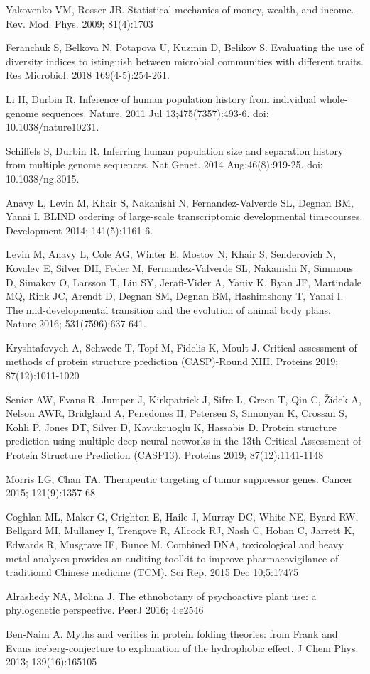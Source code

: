 \documentclass[12pt,aps]{revtex4}
\begin{document}
\begin{thebibliography}{00}

 Yakovenko VM, Rosser JB. Statistical mechanics of money, wealth, and income. Rev. Mod. Phys. 2009; 81(4):1703

 Feranchuk S, Belkova N, Potapova U, Kuzmin D, Belikov S. Evaluating the use of diversity indices to istinguish between microbial communities with different traits. Res Microbiol. 2018 169(4-5):254-261.

 Li H, Durbin R. Inference of human population history from individual whole-genome sequences. Nature. 2011 Jul 13;475(7357):493-6. doi: 10.1038/nature10231.

 Schiffels S, Durbin R. Inferring human population size and separation history from multiple genome sequences. Nat Genet. 2014 Aug;46(8):919-25. doi: 10.1038/ng.3015. 

 Anavy L, Levin M, Khair S, Nakanishi N, Fernandez-Valverde SL, Degnan BM, Yanai I. BLIND ordering of large-scale transcriptomic developmental timecourses. Development 2014; 141(5):1161-6.

 Levin M, Anavy L, Cole AG, Winter E, Mostov N, Khair S, Senderovich N, Kovalev E, Silver DH, Feder M, Fernandez-Valverde SL, Nakanishi N, Simmons D, Simakov O, Larsson T, Liu SY, Jerafi-Vider A, Yaniv K, Ryan JF, Martindale MQ, Rink JC, Arendt D, Degnan SM, Degnan BM, Hashimshony T, Yanai I. The mid-developmental transition and the evolution of animal body plans. Nature 2016; 531(7596):637-641.

 Kryshtafovych A, Schwede T, Topf M, Fidelis K, Moult J. Critical assessment of methods of protein structure prediction (CASP)-Round XIII. Proteins 2019; 87(12):1011-1020

 Senior AW, Evans R, Jumper J, Kirkpatrick J, Sifre L, Green T, Qin C, Žídek A, Nelson AWR, Bridgland A, Penedones H, Petersen S, Simonyan K, Crossan S, Kohli P, Jones DT, Silver D, Kavukcuoglu K, Hassabis D. Protein structure prediction using multiple deep neural networks in the 13th Critical Assessment of Protein Structure Prediction (CASP13). Proteins 2019; 87(12):1141-1148

 Morris LG, Chan TA. Therapeutic targeting of tumor suppressor genes. Cancer 2015; 121(9):1357-68

 Coghlan ML, Maker G, Crighton E, Haile J, Murray DC, White NE, Byard RW, Bellgard MI, Mullaney I, Trengove R, Allcock RJ, Nash C, Hoban C, Jarrett K, Edwards R, Musgrave IF, Bunce M. Combined DNA, toxicological and heavy metal analyses provides an auditing toolkit to improve pharmacovigilance of traditional Chinese medicine (TCM). Sci Rep. 2015 Dec 10;5:17475

 Alrashedy NA, Molina J. The ethnobotany of psychoactive plant use: a phylogenetic perspective. PeerJ 2016; 4:e2546

 Ben-Naim A. Myths and verities in protein folding theories: from Frank and Evans iceberg-conjecture to explanation of the hydrophobic effect. J Chem Phys. 2013; 139(16):165105

\end{thebibliography}
\end{document}
